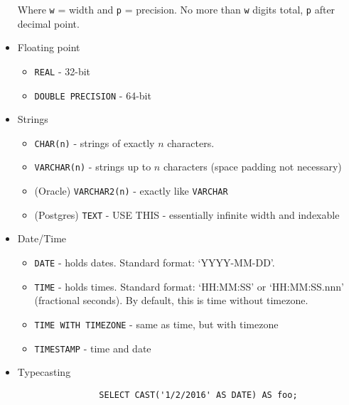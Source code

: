 \documentclass{cheatsheet}
\begin{document}
\begin{multicols*}{2}
\begin{itemize}
            Where \texttt{w} = width and \texttt{p} = precision. No more than
            \texttt{w} digits total, \texttt{p} after decimal point.

        \item Floating point
            \begin{itemize}
                \item \texttt{REAL} - 32-bit
                \item \texttt{DOUBLE PRECISION} - 64-bit
            \end{itemize}

        \item Strings
            \begin{itemize}
                \item \texttt{CHAR(n)} - strings of exactly $n$ characters.
                \item \texttt{VARCHAR(n)} - strings up to $n$ characters (space
                    padding not necessary)
                \item (Oracle) \texttt{VARCHAR2(n)} - exactly like \texttt{VARCHAR}
                \item (Postgres) \texttt{TEXT} - USE THIS - essentially infinite
                    width and indexable
            \end{itemize}

        \item Date/Time
            \begin{itemize}
                \item \texttt{DATE} - holds dates. Standard format: `YYYY-MM-DD'.
                \item \texttt{TIME} - holds times. Standard format: `HH:MM:SS' or
                    `HH:MM:SS.nnn' (fractional seconds). By default, this is time
                    without timezone.
                \item \texttt{TIME WITH TIMEZONE} - same as time, but with timezone
                \item \texttt{TIMESTAMP} - time and date
            \end{itemize}

        \item Typecasting
            \begin{verbatim}
                SELECT CAST('1/2/2016' AS DATE) AS foo;
            \end{verbatim}

    \end{itemize}


\end{multicols*}
\end{document}
